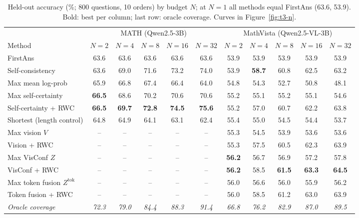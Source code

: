 \begin{table}[t]
\centering
\small
\caption{Held-out accuracy (\%; 800 questions, 10 orders) by budget $N$; at $N{=}1$ all methods equal FirstAns (63.6, 53.9). Bold: best per column; last row: oracle coverage. Curves in Figure~\ref{fig:t3-n}.}
\label{tab:t3-methods}
\begin{adjustbox}{max width=\linewidth}
\begin{tabular}{lcccccccccc}
\toprule
 & \multicolumn{5}{c}{MATH (Qwen2.5-3B)} & \multicolumn{5}{c}{MathVista (Qwen2.5-VL-3B)} \\
\cmidrule(lr){2-6}\cmidrule(lr){7-11}
Method & $N{=}2$ & $N{=}4$ & $N{=}8$ & $N{=}16$ & $N{=}32$ & $N{=}2$ & $N{=}4$ & $N{=}8$ & $N{=}16$ & $N{=}32$ \\
\midrule
FirstAns & 63.6 & 63.6 & 63.6 & 63.6 & 63.6 & 53.9 & 53.9 & 53.9 & 53.9 & 53.9 \\
Self-consistency & 63.6 & 69.0 & 71.6 & 73.2 & 74.0 & 53.9 & \textbf{58.7} & 60.8 & 62.5 & 63.2 \\
Max mean log-prob & 65.9 & 66.8 & 67.4 & 66.4 & 64.0 & 54.8 & 54.3 & 52.7 & 50.8 & 48.1 \\
Max self-certainty & \textbf{66.5} & 68.6 & 70.2 & 70.6 & 70.6 & 55.2 & 55.1 & 55.2 & 55.1 & 54.6 \\
Self-certainty + RWC & \textbf{66.5} & \textbf{69.7} & \textbf{72.8} & \textbf{74.5} & \textbf{75.6} & 55.2 & 57.0 & 60.7 & 62.2 & 63.8 \\
Shortest (length control) & 64.8 & 64.9 & 64.1 & 63.1 & 62.4 & 55.4 & 55.0 & 54.5 & 54.4 & 53.7 \\
\midrule
Max vision $V$ & -- & -- & -- & -- & -- & 55.3 & 54.5 & 53.9 & 53.6 & 53.6 \\
Vision + RWC & -- & -- & -- & -- & -- & 55.3 & 57.5 & 60.5 & 62.3 & 63.9 \\
Max VisConf $Z$ & -- & -- & -- & -- & -- & \textbf{56.2} & 56.7 & 56.9 & 57.2 & 57.8 \\
VisConf + RWC & -- & -- & -- & -- & -- & \textbf{56.2} & 58.5 & \textbf{61.5} & \textbf{63.3} & \textbf{64.5} \\
Max token fusion $Z^\text{tok}$ & -- & -- & -- & -- & -- & 56.0 & 56.6 & 56.0 & 55.9 & 56.2 \\
Token fusion + RWC & -- & -- & -- & -- & -- & 56.0 & 58.5 & 61.2 & 63.0 & 63.9 \\
\midrule
\emph{Oracle coverage} & \emph{72.3} & \emph{79.0} & \emph{84.4} & \emph{88.3} & \emph{91.4} & \emph{66.8} & \emph{76.2} & \emph{82.9} & \emph{87.0} & \emph{89.5} \\
\bottomrule
\end{tabular}
\end{adjustbox}
\end{table}
